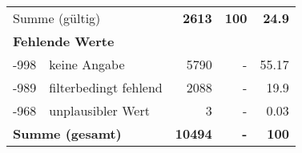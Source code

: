 \begin{longtable}{lXrrr}
     \midrule
     \multicolumn{2}{l}{Summe (gültig)} &
       \textbf{\num{2613}} &
     \textbf{\num{100}} &
       \textbf{\num[round-mode=places,round-precision=2]{24.9}} \\
     \multicolumn{5}{l}{\textbf{Fehlende Werte}}\\
       -998 &
       keine Angabe &
         \num{5790} &
        - &
         \num[round-mode=places,round-precision=2]{55.17} \\
       -989 &
       filterbedingt fehlend &
         \num{2088} &
        - &
         \num[round-mode=places,round-precision=2]{19.9} \\
       -968 &
       unplausibler Wert &
         \num{3} &
        - &
         \num[round-mode=places,round-precision=2]{0.03} \\
     \midrule
     \multicolumn{2}{l}{\textbf{Summe (gesamt)}} &
          \textbf{\num{10494}} &
        \textbf{-} &
        \textbf{\num{100}} \\
     \bottomrule
     \end{longtable}
     
